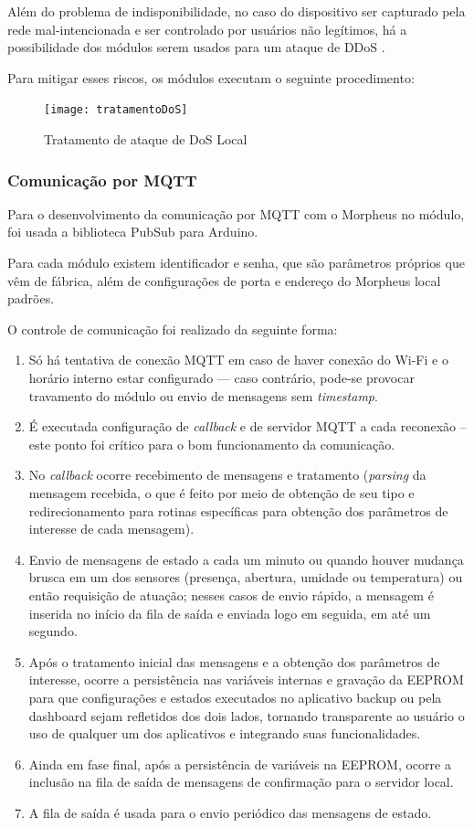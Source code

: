 Além do problema de indisponibilidade, no caso do dispositivo ser capturado pela rede mal-intencionada e ser controlado por usuários não legítimos, há a possibilidade dos módulos serem usados para um ataque de DDoS \cite{OVHDDoS}.

Para mitigar esses riscos, os módulos executam o seguinte procedimento:

\begin{figure}[H]
	\centering
	\caption{Tratamento de ataque de DoS Local}
  \texttt{[image: tratamentoDoS]}
\label{fig:tratamentoDoS}
\end{figure}

\subsubsection{Comunicação por MQTT}
Para o desenvolvimento da comunicação por MQTT com o Morpheus no módulo, foi usada a biblioteca PubSub \cite{PubSub} para Arduino.

Para cada módulo existem identificador e senha, que são parâmetros próprios que vêm de fábrica, além de configurações de porta e endereço do Morpheus local padrões.

O controle de comunicação foi realizado da seguinte forma:

\begin{enumerate}
	\item Só há tentativa de conexão MQTT em caso de haver conexão do Wi-Fi e o horário interno estar configurado --- caso contrário, pode-se provocar travamento do módulo ou envio de mensagens sem \emph{timestamp}.
	\item É executada configuração de \emph{callback} e de servidor MQTT a cada reconexão -- este ponto foi crítico para o bom funcionamento da comunicação.
	\item No \emph{callback} ocorre recebimento de mensagens e tratamento (\emph{parsing} da mensagem recebida, o que é feito por meio de obtenção de seu tipo e redirecionamento para rotinas específicas para obtenção dos parâmetros de interesse de cada mensagem).
	\item Envio de mensagens de estado a cada um minuto ou quando houver mudança brusca em um dos sensores (presença, abertura, umidade ou temperatura) ou então requisição de atuação; nesses casos de envio rápido, a mensagem é inserida no início da fila de saída e enviada logo em seguida, em até um segundo.
	\item Após o tratamento inicial das mensagens e a obtenção dos parâmetros de interesse, ocorre a persistência nas variáveis internas e gravação da EEPROM para que configurações e estados executados no aplicativo backup ou pela dashboard sejam refletidos dos dois lados, tornando transparente ao usuário o uso de qualquer um dos aplicativos e integrando suas funcionalidades.
	\item Ainda em fase final, após a persistência de variáveis na EEPROM, ocorre a inclusão na fila de saída de mensagens de confirmação para o servidor local.
	\item A fila de saída é usada para o envio periódico das mensagens de estado.
\end{enumerate}

